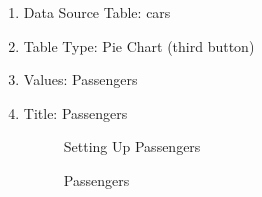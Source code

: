 \begin{enumerate}
  \item Data Source Table: cars
  \item Table Type: Pie Chart (third button)
  \item Values: Passengers 
  \item Title: Passengers
  
  \begin{figure}[H]
    \begin{center}
      \caption{Setting Up Passengers}
    \end{center}
  \end{figure}
  
  \begin{figure}[H]
    \begin{center}
      \caption{Passengers}
    \end{center}
  \end{figure}
  
\end{enumerate}

